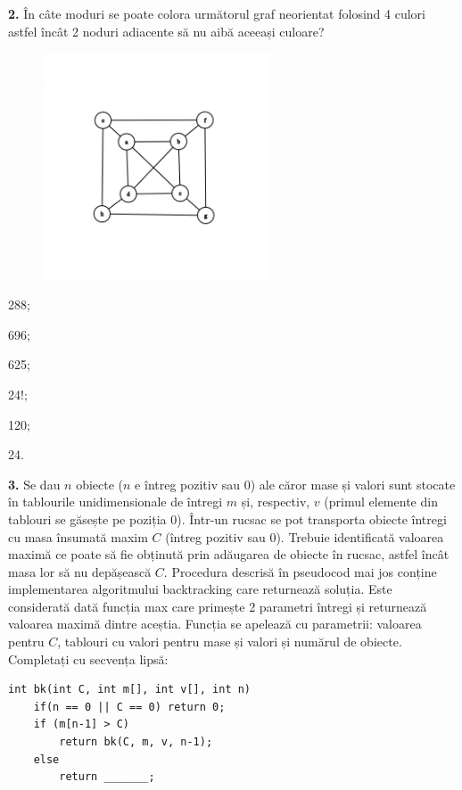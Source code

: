 \documentclass[11pt, a4paper]{article}
\begin{document}
\vspace{0.5cm}

\textbf{2.}\newline
În câte moduri se poate colora următorul graf neorientat folosind 4 culori astfel încât 2 noduri adiacente să nu aibă aceeași culoare?
\begin{figure}[h!]
    \centering
    \includegraphics[width=0.6\textwidth]{graph2.png}
\end{figure}
\begin{inparaenum}
    \item 288;
    \item 696;
    \item 625;
    \item 24!;
    \item 120;
    \item 24.
\end{inparaenum}

\vspace{0.5cm}

\textbf{3.}\newline
Se dau $n$ obiecte ($n$ e întreg pozitiv sau $0$) ale căror mase și valori sunt stocate în tablourile unidimensionale de întregi $m$ și, respectiv, $v$ (primul elemente din tablouri se găsește pe poziția $0$). Într-un rucsac se pot transporta obiecte întregi cu masa însumată maxim $C$ (întreg pozitiv sau $0$). Trebuie identificată valoarea maximă ce poate să fie obținută prin adăugarea de obiecte în rucsac, astfel încât masa lor să nu depășească $C$. Procedura descrisă în pseudocod mai jos conține implementarea algoritmului backtracking care returnează soluția. Este considerată dată funcția max care primește 2 parametri întregi și returnează valoarea maximă dintre aceștia. Funcția se apelează cu parametrii: valoarea pentru $C$, tablouri cu valori pentru mase și valori și numărul de obiecte. Completați cu secvența lipsă:
\begin{lstlisting}
int bk(int C, int m[], int v[], int n)
    if(n == 0 || C == 0) return 0;
    if (m[n-1] > C)
        return bk(C, m, v, n-1);
    else
        return _______;
\end{lstlisting}
\end{document}
